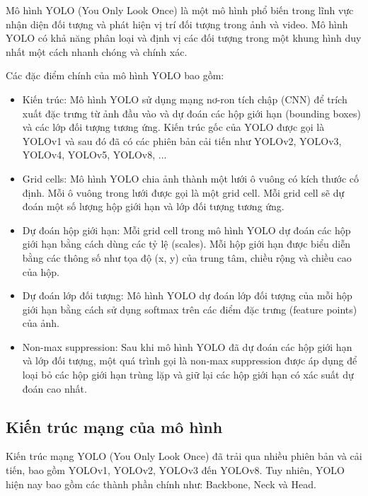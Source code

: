 Mô hình YOLO (You Only Look Once) là một mô hình phổ biến trong lĩnh vực nhận diện đối tượng và phát hiện vị trí đối tượng trong ảnh và video. Mô hình YOLO có khả năng phân loại và định vị các đối tượng trong một khung hình duy nhất một cách nhanh chóng và chính xác.

Các đặc điểm chính của mô hình YOLO bao gồm:
\begin{itemize}
    \item Kiến trúc: Mô hình YOLO sử dụng mạng nơ-ron tích chập (CNN) để trích xuất đặc trưng từ ảnh đầu vào và dự đoán các hộp giới hạn (bounding boxes) và các lớp đối tượng tương ứng. Kiến trúc gốc của YOLO được gọi là YOLOv1 và sau đó đã có các phiên bản cải tiến như YOLOv2, YOLOv3,  YOLOv4, YOLOv5, YOLOv8, ...
    \item Grid cells: Mô hình YOLO chia ảnh thành một lưới ô vuông có kích thước cố định. Mỗi ô vuông trong lưới được gọi là một grid cell. Mỗi grid cell sẽ dự đoán một số lượng hộp giới hạn và lớp đối tượng tương ứng.
    \item Dự đoán hộp giới hạn: Mỗi grid cell trong mô hình YOLO dự đoán các hộp giới hạn bằng cách dùng các tỷ lệ (scales). Mỗi hộp giới hạn được biểu diễn bằng các thông số như tọa độ (x, y) của trung tâm, chiều rộng và chiều cao của hộp.
    \item Dự đoán lớp đối tượng: Mô hình YOLO dự đoán lớp đối tượng của mỗi hộp giới hạn bằng cách sử dụng softmax trên các điểm đặc trưng (feature points) của ảnh.
    \item Non-max suppression: Sau khi mô hình YOLO đã dự đoán các hộp giới hạn và lớp đối tượng, một quá trình gọi là non-max suppression được áp dụng để loại bỏ các hộp giới hạn trùng lặp và giữ lại các hộp giới hạn có xác suất dự đoán cao nhất.
\end{itemize}


\subsection{Kiến trúc mạng của mô hình}

Kiến trúc mạng YOLO (You Only Look Once) đã trải qua nhiều phiên bản và cải tiến, bao gồm YOLOv1, YOLOv2, YOLOv3 đến YOLOv8. Tuy nhiên, YOLO hiện nay bao gồm các thành phần chính như: Backbone, Neck và Head.

